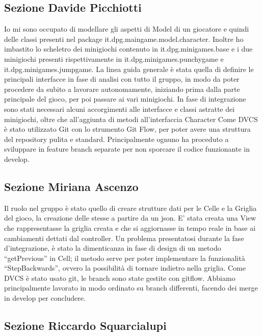 \documentclass[a4paper,12pt]{report}
\begin{document}
	\subsection{Sezione Davide Picchiotti}

    Io mi sono occupato di modellare gli aspetti di Model di un giocatore e quindi delle classi presenti nel package it.dpg.maingame.model.character.\newline
    Inoltre ho imbastito lo scheletro dei minigiochi contenuto in it.dpg.minigames.base e i due minigiochi presenti rispettivamente in it.dpg.minigames.punchygame e it.dpg.minigames.jumpgame.\newline
    La linea guida generale è stata quella di definire le principali interfacce in fase di analisi con tutto il gruppo, in modo da poter procedere da subito a lavorare autonomamente,
    iniziando prima dalla parte principale del gioco, per poi passare ai vari minigiochi.\newline
    In fase di integrazione sono stati necessari alcuni accorgimenti alle interfacce e classi astratte dei minigiochi, oltre che all'aggiunta di metodi all'interfaccia Character\newline
    Come DVCS è stato utilizzato Git con lo strumento Git Flow, per poter avere una struttura del repository pulita e standard.
    Principalmente ognuno ha proceduto a sviluppare in feature branch separate per non sporcare il codice funzionante in develop.

	\subsection{Sezione Miriana Ascenzo}

	Il ruolo nel gruppo è stato quello di creare strutture dati per le Celle e la Griglia del gioco, la creazione delle stesse a partire da un json.
    E' stata creata una View che rappresentasse la griglia creata e che si aggiornasse in tempo reale in base ai cambiamenti dettati dal controller.
	Un problema presentatosi durante la fase d’integrazione, è stato la dimenticanza in fase di design di un metodo “getPrevious” in Cell;
    il metodo serve per poter implementare la funzionalità “StepBackwards”, ovvero la possibilità di tornare indietro nella griglia.
    Come DVCS è stato usato git, le branch sono state gestite con gitflow.
    Abbiamo principalmente lavorato in modo ordinato su branch differenti, facendo dei merge in develop per concludere.

	\subsection{Sezione Riccardo Squarcialupi}
\end{document}
